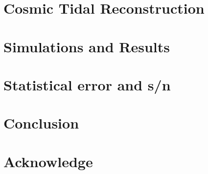 \documentclass[aps,prd,twocolumn,showpacs,superscriptaddress,groupedaddress,nofootinbib]{revtex4}  %
\begin{document}
\section{Cosmic Tidal Reconstruction}

\section{Simulations and Results}

%
%
\section{Statistical error and s/n}

\section{Conclusion}

\section{Acknowledge}

%


\end{document}
